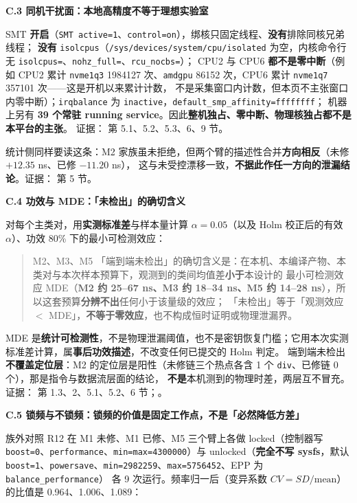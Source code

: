 \noindent\textbf{C.3 同机干扰面：本地高精度不等于理想实验室}\par
SMT \textbf{开启}（\texttt{SMT active=1}、\texttt{control=on}），绑核只固定线程、\textbf{没有}排除同核兄弟线程；
\textbf{没有} \texttt{isolcpus}（\texttt{/sys/devices/system/cpu/isolated} 为空，内核命令行无 \texttt{isolcpus=}、\texttt{nohz\_full=}、\texttt{rcu\_nocbs=}）；
CPU2 与 CPU6 \textbf{都不是零中断}（例如 CPU2 累计 \texttt{nvme1q3} 1984127 次、\texttt{amdgpu} 86152 次，CPU6 累计 \texttt{nvme1q7} 357101 次——这是开机以来累计计数，
不是采集窗口内计数，但本页不主张窗口内零中断）；\texttt{irqbalance} 为 \texttt{inactive}，\texttt{default\_smp\_affinity=ffffffff}；
机器上另有 \textbf{39 个常驻 running service}。因此\textbf{整机独占、零中断、物理核独占都不是本平台的主张}。
证据： 第 5.1、5.2、5.3、6、9 节。\par
统计侧同样要读这条：M2 家族虽未拒绝，但两个臂的描述性合并\textbf{方向相反}（未修 $+12.35$ ns、已修 $-11.20$ ns），
这与未受控漂移一致，\textbf{不据此作任一方向的泄漏结论}。证据：\texttt{} 第 5 节。

\noindent\textbf{C.4 功效与 MDE：「未检出」的确切含义}\par
对每个主类对，用\textbf{实测标准差}与样本量计算 $\alpha=0.05$（以及 Holm 校正后的有效 $\alpha$）、功效 80\% 下的最小可检测效应：

\begin{quote}
M2、M3、M5 「端到端未检出」的确切含义是：在本机、本编译产物、本类对与本次样本预算下，观测到的类间均值差\textbf{小于}本设计的
最小可检测效应 MDE（\textbf{M2 约 25--67 ns、M3 约 18--34 ns、M5 约 14--28 ns}），所以这套预算\textbf{分辨不出}任何小于该量级的效应；
「未检出」等于「观测效应 $<$ MDE」，\textbf{不等于零效应}，也不构成恒时证明或物理泄漏界。
\end{quote}

\noindent MDE 是\textbf{统计可检测性}，不是物理泄漏阈值，也不是密钥恢复门槛；它用本次实测标准差计算，属\textbf{事后功效描述}，不改变任何已提交的 Holm 判定。
端到端未检出\textbf{不覆盖定位层}：M2 的定位层是阳性（未修链三个热点各含 1 个 \texttt{div}、已修链 0 个），那是指令与数据流层面的结论，
\textbf{不是}本机测到的物理时差，两层互不冒充。
证据：\texttt{} 第 1.3、2、5.1、5.2、6 节；。

\noindent\textbf{C.5 锁频与不锁频：锁频的价值是固定工作点，不是「必然降低方差」}\par
族外对照 R12 在 M1 未修、M1 已修、M5 三个臂上各做 locked（控制器写 \texttt{boost=0}、\texttt{performance}、\texttt{min=max=4300000}）与
unlocked（\textbf{完全不写 sysfs}，默认 \texttt{boost=1}、\texttt{powersave}、\texttt{min=2982259}、\texttt{max=5756452}、EPP 为 \texttt{balance\_performance}）
各 9 次运行。频率归一后（变异系数 $CV=SD/\text{mean}$）的比值是 0.964、1.006、1.089：

